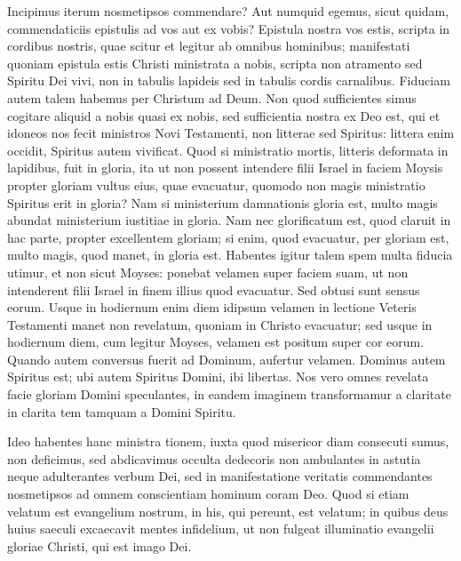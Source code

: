 \begin{biblechapter}
\begin{biblechapter}
\begin{biblechapter}
\verse Incipimus iterum nosmetipsos commendare? Aut numquid egemus, sicut quidam, commendaticiis epistulis ad vos aut ex vobis? 
\verse Epistula nostra vos estis, scripta in cordibus nostris, quae scitur et legitur ab omnibus hominibus; 
\verse manifestati quoniam epistula estis Christi ministrata a nobis, scripta non atramento sed Spiritu Dei vivi, non in tabulis lapideis sed in tabulis cordis carnalibus.
 \verse Fiduciam autem talem habemus per Christum ad Deum. 
\verse Non quod sufficientes simus cogitare aliquid a nobis quasi ex nobis, sed sufficientia nostra ex Deo est, 
\verse qui et idoneos nos fecit ministros Novi Testamenti, non litterae sed Spiritus: littera enim occidit, Spiritus autem vivificat.
 \verse Quod si ministratio mortis, litteris deformata in lapidibus, fuit in gloria, ita ut non possent intendere filii Israel in faciem Moysis propter gloriam vultus eius, quae evacuatur, 
\verse quomodo non magis ministratio Spiritus erit in gloria? 
\verse Nam si ministerium damnationis gloria est, multo magis abundat ministerium iustitiae in gloria. 
\verse Nam nec glorificatum est, quod claruit in hac parte, propter excellentem gloriam; 
\verse si enim, quod evacuatur, per gloriam est, multo magis, quod manet, in gloria est.
 \verse Habentes igitur talem spem multa fiducia utimur, 
\verse et non sicut Moyses: ponebat velamen super faciem suam, ut non intenderent filii Israel in finem illius quod evacuatur. 
\verse Sed obtusi sunt sensus eorum. Usque in hodiernum enim diem idipsum velamen in lectione Veteris Testamenti manet non revelatum, quoniam in Christo evacuatur; 
\verse sed usque in hodiernum diem, cum legitur Moyses, velamen est positum super cor eorum. 
\verse Quando autem conversus fuerit ad Dominum, aufertur velamen. 
\verse Dominus autem Spiritus est; ubi autem Spiritus Domini, ibi libertas. 
\verse Nos vero omnes revelata facie gloriam Domini speculantes, in eandem imaginem transformamur a claritate in clarita tem tamquam a Domini Spiritu. 
  
\begin{biblechapter}
\verse Ideo habentes hanc ministra tionem, iuxta quod misericor diam consecuti sumus, non deficimus, 
\verse sed abdicavimus occulta dedecoris non ambulantes in astutia neque adulterantes verbum Dei, sed in manifestatione veritatis commendantes nosmetipsos ad omnem conscientiam hominum coram Deo.
 \verse Quod si etiam velatum est evangelium nostrum, in his, qui pereunt, est velatum; 
\verse in quibus deus huius saeculi excaecavit mentes infidelium, ut non fulgeat illuminatio evangelii gloriae Christi, qui est imago Dei. 

\end{biblechapter}
\end{biblechapter}
\end{biblechapter}
\end{biblechapter}
